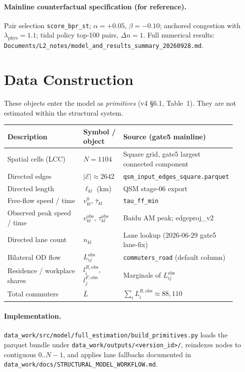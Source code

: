 \documentclass[11pt]{article}
\newcommand{\Lbar}{\bar L}
\newcommand{\obs}{\mathrm{obs}}
\newcommand{\phys}{\mathrm{phys}}
\begin{document}
\paragraph{Mainline counterfactual specification (for reference).}
Pair selection \texttt{score\_bpr\_st}; $\alpha=+0.05$, $\beta=-0.10$;
anchored congestion with $\lambda_{\phys}=1.1$; tidal policy top-100
pairs, $\Delta n=1$.  Full numerical results:
\texttt{Documents/L2\_notes/model\_and\_results\_summary\_20260928.md}.

\section{Data Construction}\label{sec:data}

These objects enter the model as \emph{primitives} (v4 \S6.1, Table~1).
They are not estimated within the structural system.

\begin{longtable}{@{}p{0.42\linewidth}p{0.18\linewidth}p{0.32\linewidth}@{}}
\toprule
\textbf{Description} & \textbf{Symbol / object} & \textbf{Source (gate5 mainline)} \\
\midrule
\endhead
Spatial cells (LCC) & $N=1104$ & Square grid, gate5 largest connected component \\
Directed edges & $|\mathcal{E}|\approx 2642$ & \texttt{qsm\_input\_edges\_square.parquet} \\
Directed length & $\ell_{kl}$ (km) & QSM stage-06 export \\
Free-flow speed / time & $v^0_{kl}$, $\bar\tau_{kl}$ & \texttt{tau\_ff\_min} \\
Observed peak speed / time & $v^{\obs}_{kl}$, $\tau^{\obs}_{kl}$ & Baidu AM peak; edgeproj\_v2 \\
Directed lane count & $n_{kl}$ & Lane lookup (2026-06-29 gate5 lane-fix) \\
Bilateral OD flow & $L^{\obs}_{ij}$ & \texttt{commuters\_road} (default column) \\
Residence / workplace shares & $l^{R,\obs}_i$, $l^{F,\obs}_j$ & Marginals of $L^{\obs}_{ij}$ \\
Total commuters & $\Lbar$ & $\sum_i L^{R,\obs}_i \approx 88{,}110$ \\
\bottomrule
\end{longtable}

\paragraph{Implementation.}
\texttt{data\_work/src/model/full\_estimation/build\_primitives.py}
loads the parquet bundle under
\texttt{data\_work/outputs/<version\_id>/}, reindexes nodes to
contiguous $0..N-1$, and applies lane fallbacks documented in
\texttt{data\_work/docs/STRUCTURAL\_MODEL\_WORKFLOW.md}.
\end{document}
